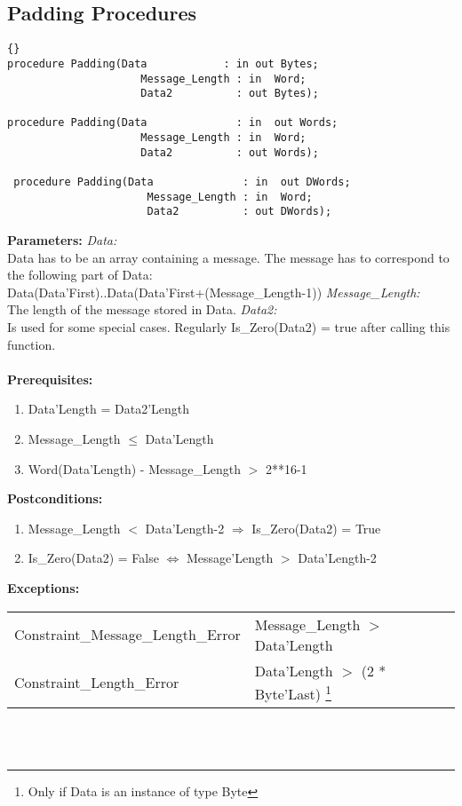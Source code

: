 \subsection{Padding Procedures}
 \begin{lstlisting}{}
procedure Padding(Data            : in out Bytes;
                     Message_Length : in  Word;
                     Data2          : out Bytes);

procedure Padding(Data              : in  out Words;
                     Message_Length : in  Word;
                     Data2          : out Words);

 procedure Padding(Data              : in  out DWords;
                      Message_Length : in  Word;
                      Data2          : out DWords); 
 \end{lstlisting}
 \textbf{Parameters:}
 \textit{Data:}\\
 Data has to be an array containing a message.
 The message has to correspond to the following part of Data:\\
 Data(Data'First)..Data(Data'First+(Message\_Length-1))
\textit{Message\_Length:}\\
The length of the message stored in Data.
\textit{Data2:}\\
Is used for some special cases. Regularly
Is\_Zero(Data2) = true after calling this function.\\
\ \\
\textbf{Prerequisites:}
 \begin{enumerate}
 \item Data'Length = Data2'Length
 \item Message\_Length $\le$ Data'Length
 \item Word(Data'Length) - Message\_Length $>$ 2**16-1\footnotemark 
 \end{enumerate}
 \textbf{Postconditions:}
 \begin{enumerate}
 \item Message\_Length $<$ Data'Length-2 $\Rightarrow$ Is\_Zero(Data2) = True
 \item Is\_Zero(Data2) = False  $\Longleftrightarrow$ Message'Length $>$ 
   Data'Length-2
 \end{enumerate}
 \textbf{Exceptions:}\\
 \addtocounter{footnote}{-1} 
\begin{tabular}{l@{ : }l}
 Constraint\_Message\_Length\_Error &  Message\_Length $>$ Data'Length\\
 Constraint\_Length\_Error &  Data'Length $>$ (2 * Byte'Last)
 \footnote{Only if Data is an instance of type Byte}\\
 \end{tabular}\ \\ \ \\
